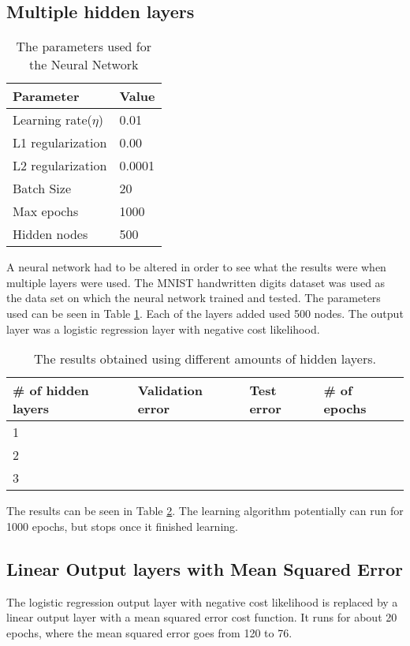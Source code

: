 
\subsection*{Multiple hidden layers}

\begin{table}[!h]
\centering
\begin{tabular}{ll}
\textbf{Parameter}           & \textbf{Value} \\ \hline  
Learning rate($\eta$) & 0.01   \\
L1 regularization   & 0.00   \\
L2 regularization   & 0.0001 \\
Batch Size          & 20     \\
Max epochs          & 1000   \\
Hidden nodes        & 500   
\end{tabular}
\caption{The parameters used for the Neural Network}
\label{parameters1}
\end{table}

A neural network had to be altered in order to see what the results were when multiple layers were used. The MNIST handwritten digits dataset was used as the data set on which the neural network trained and tested. The parameters used can be seen in Table \ref{parameters1}. Each of the layers added used 500 nodes. The output layer was a logistic regression layer with negative cost likelihood.

\begin{table}[!h]
\centering
\begin{tabular}{llll}
\textbf{\# of hidden layers} & \textbf{Validation error} & \textbf{Test error} & \textbf{\# of epochs} \\ \hline
1                            &                           &                     &                       \\
2                            &                           &                     &                       \\
3                            &                           &                     &                      
\end{tabular}
\caption{The results obtained using different amounts of hidden layers.}
\label{results1}
\end{table}

The results can be seen in Table \ref{results1}. The learning algorithm potentially can run for 1000 epochs, but stops once it finished learning.

\subsection*{Linear Output layers with Mean Squared Error}

The logistic regression output layer with negative cost likelihood is replaced by a linear output layer with a mean squared error cost function. It runs for about 20 epochs, where the mean squared error goes from 120 to 76.